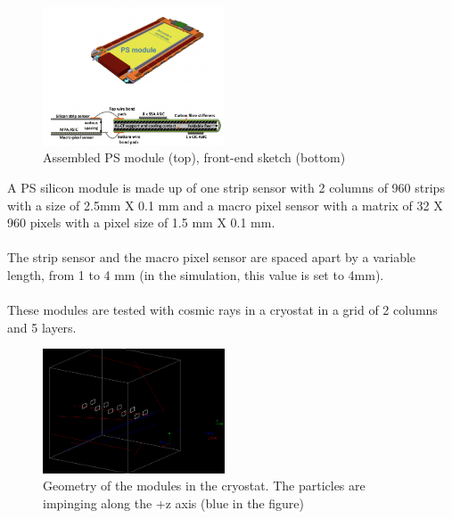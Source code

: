 \documentclass[10pt, a4paper, twocolumn]{article} %
\begin{document}
\begin{figure}[h!]
    \centering
    \includegraphics[width=0.48\textwidth]{img/ps_module.png}
    \caption{Assembled PS module (top), front-end sketch (bottom)}
    \label{fig:PS}
\end{figure}
A PS silicon module is made up of one strip sensor with 2 columns of 960 strips with a size of 2.5mm X 0.1 mm and a macro pixel sensor with a matrix of 32 X 960 pixels with a pixel size of 1.5 mm X 0.1 mm. \cite{PS}
\\
\\
The strip sensor and the macro pixel sensor are spaced apart by a variable length, from 1 to 4 mm (in the simulation, this value is set to 4mm).  
\\
\\
These modules are tested with cosmic rays in a cryostat in a grid of 2 columns and 5 layers.
\begin{figure}[h!]
    \centering
    \includegraphics[width=0.48\textwidth]{img/detector.png}
    \caption{Geometry of the modules in the cryostat. The particles are impinging along the +z axis (blue in the figure)}
    \label{fig:Detector}
\end{figure}
\end{document}
